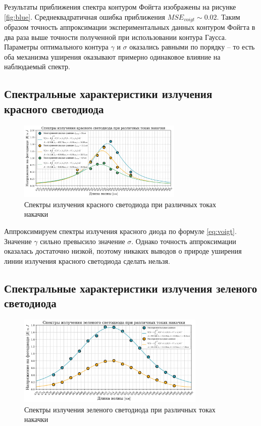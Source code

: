 \documentclass[a4paper, 12pt]{extarticle}
\begin{document}
Результаты приближения спектра контуром Фойгта изображены на рисунке \ref{fig:blue}. Среднеквадратичная ошибка приближения $MSE_{voigt} \sim 0.02$. Таким образом точность аппроксимации экспериментальных данных контуром Фойгта в два раза выше точности полученной при использовании контура Гаусса. Параметры оптимального контура $\gamma$ и $\sigma$ оказались равными по порядку -- то есть оба механизма уширения оказывают примерно одинаковое влияние на наблюдаемый спектр.



\subsection*{\textcolor{sub_header}{Спектральные характеристики излучения красного светодиода}}
\begin{figure}[htbp]
    \centering
    \includegraphics[width = 0.7\textwidth]{red.png}
    \caption{Спектры излучения красного светодиода при различных токах накачки}
    \label{fig:red}
\end{figure}

Аппроксимируем спектры излучения красного диода по формуле \ref{eq:voigt}. Значение $\gamma$ сильно превысило значение $\sigma$. Однако точность аппроксимации оказалась достаточно низкой, поэтому никаких выводов о природе уширения линии излучения красного светодиода сделать нельзя.

\subsection*{\textcolor{sub_header}{Спектральные характеристики излучения зеленого светодиода}}

\begin{figure}[htbp]
    \centering
    \includegraphics[width = 0.8\textwidth]{green.png}
    \caption{Спектры излучения зеленого светодиода при различных токах накачки}
    \label{fig:green}
\end{figure}
\end{document}
